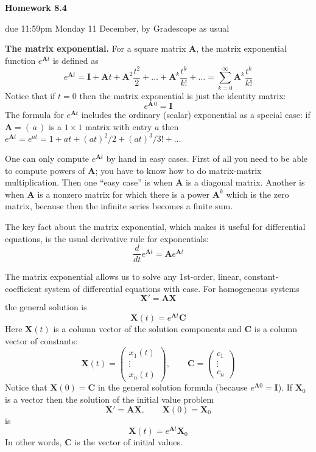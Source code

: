 \documentclass[12pt]{article}
\theoremstyle{definition}
\newcommand{\bA}{\mathbf{A}}
\newcommand{\bC}{\mathbf{C}}
\newcommand{\bI}{\mathbf{I}}
\newcommand{\bX}{\mathbf{X}}
\begin{document}
\strut
\centerline{{\Large \textbf{Homework 8.4}}}

\bigskip
\centerline{{\large due 11:59pm Monday 11 December, by Gradescope as usual}}

\bigskip
\small
\noindent \textbf{The matrix exponential.}  For a square matrix $\bA$, the matrix exponential function $e^{\bA t}$ is defined as
	$$e^{\bA t} = \bI + \bA t + \bA^2 \frac{t^2}{2} + \dots + \bA^k \frac{t^k}{k!} + \dots = \sum_{k=0}^\infty \bA^k \frac{t^k}{k!}$$
Notice that if $t=0$ then the matrix exponential is just the identity matrix:
    $$e^{\bA\,0} = \bI$$
The formula for $e^{\bA t}$ includes the ordinary (scalar) exponential as a special case: if $\bA = (\,a\,)$ is a $1\times 1$ matrix with entry $a$ then $e^{\bA t} = e^{at} = 1 + at + (at)^2/2 + (at)^3/3! + \dots$

One can only compute $e^{\bA t}$ by hand in easy cases.  First of all you need to be able to compute powers of $\bA$; you have to know how to do matrix-matrix multiplication.  Then one ``easy case'' is when $\bA$ is a diagonal matrix.  Another is when $\bA$ is a nonzero matrix for which there is a power $\bA^k$ which is the zero matrix, because then the infinite series becomes a finite sum.

The key fact about the matrix exponential, which makes it useful for differential equations, is the usual derivative rule for exponentials:
	$$\frac{d}{dt} e^{\bA t} = \bA e^{\bA t}$$

The matrix exponential allows us to solve any 1st-order, linear, constant-coefficient system of differential equations with ease.  For homogeneous systems
	$$\bX' = \bA \bX$$
the general solution is
	$$\bX(t) = e^{\bA t} \bC$$
Here $\bX(t)$ is a column vector of the solution components and $\bC$ is a column vector of constants:
    $$\bX(t) = \begin{pmatrix} x_1(t) \\ \vdots \\ x_n(t) \end{pmatrix}, \qquad \bC = \begin{pmatrix} c_1 \\ \vdots \\ c_n \end{pmatrix}$$
Notice that $\bX(0)=\bC$ in the general solution formula (because $e^{\bA 0} = \bI$).  If $\bX_0$ is a vector then the solution of the initial value problem
	$$\bX' = \bA \bX, \qquad \bX(0) = \bX_0$$
is
	$$\bX(t) = e^{\bA t} \bX_0$$
In other words, $\bC$ is the vector of initial values.
\end{document}
